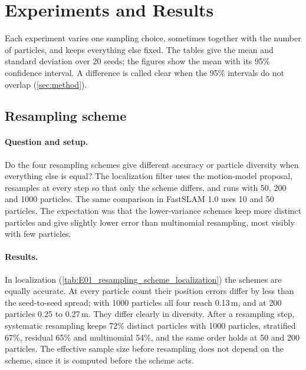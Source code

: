 \section{Experiments and Results}\label{sec:experiments}


Each experiment varies one sampling choice, sometimes together with the number of particles, and keeps everything
else fixed. The tables give the mean and standard deviation over 20 seeds; the figures show the mean with its 95\%
confidence interval. A difference is called clear when the 95\% intervals do not overlap (\cref{sec:method}).

\subsection{Resampling scheme}\label{sec:e01}

\paragraph{Question and setup.} Do the four resampling schemes give different accuracy or particle diversity when
everything else is equal? The localization filter uses the motion-model proposal, resamples at every step so that only
the scheme differs, and runs with 50, 200 and 1000 particles. The same comparison in FastSLAM 1.0 uses 10 and 50
particles. The expectation was that the lower-variance schemes keep more distinct particles and give slightly lower
error than multinomial resampling, most visibly with few particles.

\paragraph{Results.} In localization (\cref{tab:E01_resampling_scheme_localization}) the schemes are equally accurate.
At every particle count their position errors differ by less than the seed-to-seed spread; with 1000 particles all four
reach 0.13\,m, and at 200 particles 0.25 to 0.27\,m. They differ clearly in diversity. After a resampling step,
systematic resampling keeps 72\% distinct particles with 1000 particles, stratified 67\%, residual 65\% and multinomial
54\%, and the same order holds at 50 and 200 particles. The effective sample size before resampling does not depend on
the scheme, since it is computed before the scheme acts.

